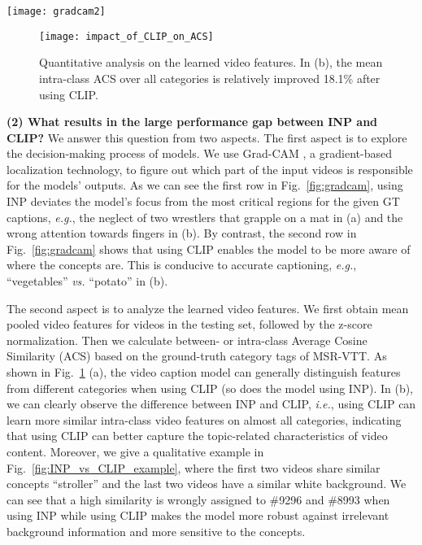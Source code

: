 \documentclass[runningheads]{llncs}
\newcommand\vs{\textit{vs.}}
\newcommand\eg{\textit{e.g.}}
\newcommand\ie{\textit{i.e.}}
\begin{document}
\begin{figure*}[t]
\centering
\texttt{[image: gradcam2]}
\caption{Grad-CAM for the given ground-truth (GT) captions. In each case, the input of the video caption model is two manually selected keyframes, based on which the actual generated description is given above the subfigure.}
\label{fig:gradcam}
\end{figure*}

\begin{figure}[t]
    \centering  
    \texttt{[image: impact\_of\_CLIP\_on\_ACS]}
    \caption{Quantitative analysis on the learned video features. In (b), the mean intra-class ACS over all categories is relatively improved 18.1\% after using CLIP.}
    \label{fig:impact_of_CLIP_on_ACS}
\end{figure}



\textbf{(2) What results in the large performance gap between INP and CLIP?} We answer this question from two aspects. The first aspect is to explore the decision-making process of models. We use Grad-CAM \cite{selvaraju2017grad}, a gradient-based localization technology, to figure out which part of the input videos is responsible for the models' outputs. As we can see the first row in Fig.~\ref{fig:gradcam}, using INP deviates the model's focus from the most critical regions for the given GT captions, \eg{}, the neglect of two wrestlers that grapple on a mat in (a) and the wrong attention towards fingers in (b). By contrast, the second row in Fig.~\ref{fig:gradcam} shows that using CLIP enables the model to be more aware of where the concepts are. This is conducive to accurate captioning, \eg{}, ``vegetables'' \vs{} ``potato'' in (b).


The second aspect is to analyze the learned video features. We first obtain mean pooled video features for videos in the testing set, followed by the z-score normalization. Then we calculate between- or intra-class Average Cosine Similarity (ACS) based on the ground-truth category tags of MSR-VTT. As shown in Fig.~\ref{fig:impact_of_CLIP_on_ACS} (a), the video caption model can generally distinguish features from different categories when using CLIP (so does the model using INP). In (b), we can clearly observe the difference between INP and CLIP, \ie{}, using CLIP can learn more similar intra-class video features on almost all categories, indicating that using CLIP can better capture the topic-related characteristics of video content. Moreover, we give a qualitative example in Fig.~\ref{fig:INP_vs_CLIP_example}, where the first two videos share similar concepts ``stroller'' and the last two videos have a similar white background. We can see that a high similarity is wrongly assigned to \#9296 and \#8993 when using INP while using CLIP makes the model more robust against irrelevant background information and more sensitive to the concepts. 
\end{document}
